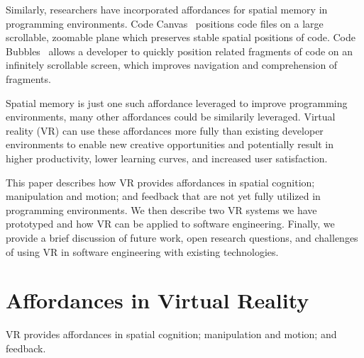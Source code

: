 \documentclass[conference]{IEEEtran}
\begin{document}
Similarly, researchers have incorporated affordances for spatial memory in programming environments.  Code Canvas~\cite{DeLine:CodeCanvas} positions code files on a large scrollable, zoomable plane which preserves stable spatial positions of code.  Code Bubbles~\cite{Bragdon:CodeBubbles} allows a developer to quickly position related fragments of code on an infinitely scrollable screen, which improves navigation and comprehension of fragments.  


Spatial memory is just one such affordance leveraged to improve programming environments, many other affordances could be similarily leveraged.
Virtual reality (VR) can use these affordances more fully than existing developer environments to enable new creative opportunities and potentially result in higher productivity, lower learning curves, and increased user satisfaction.

This paper describes how VR provides affordances in spatial cognition; manipulation and motion; and feedback that are not yet fully utilized in programming environments.  
We then describe two VR systems we have prototyped and how VR can be applied to software engineering.
Finally, we provide a brief discussion of future work, open research questions, and challenges of using VR in software engineering with existing technologies.






\section{Affordances in Virtual Reality}
VR provides affordances in spatial cognition; manipulation and motion; and feedback.
\end{document}
